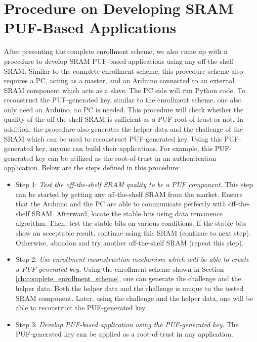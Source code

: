 
\section{Procedure on Developing SRAM PUF-Based Applications}\label{ch:procedure_develop}
After presenting the complete enrollment scheme, we also come up with a procedure to develop SRAM PUF-based applications using any off-the-shelf SRAM.
Similar to the complete enrollment scheme, this procedure scheme also requires a PC, acting as a master, and an Arduino connected to an external SRAM component which acts as a slave. The PC side will run Python code. To reconstruct the PUF-generated key, similar to the enrollment scheme, one also only need an Arduino, no PC is needed.
This procedure will check whether the quality of the off-the-shelf SRAM is sufficient as a PUF root-of-trust or not. In addition, the procedure also generates the helper data and the challenge of the SRAM which can be used to reconstruct PUF-generated key. Using this PUF-generated key, anyone can build their applications. For example, this PUF-generated key can be utilized as the root-of-trust in an authentication application. Below are the steps defined in this procedure:
\begin{itemize}
  \item Step 1: \textit{Test the off-the-shelf SRAM quality to be a PUF component.}\newline
  This step can be started by getting any off-the-shelf SRAM from the market. Ensure that the Arduino and the PC are able to communicate perfectly with off-the-shelf SRAM. Afterward, locate the stable bits using data remanence algorithm. Then, test the stable bits on various conditions. If the stable bits show an acceptable result, continue using this SRAM (continue to next step). Otherwise, abandon and try another off-the-shelf SRAM (repeat this step).
  \item Step 2: \textit{Use enrollment-reconstruction mechanism which will be able to create a PUF-generated key.}\newline
  Using the enrollment scheme shown in Section \ref{ch:complete_enrollment_scheme}, one can generate the challenge and the helper data. Both the helper data and the challenge is unique to the tested SRAM component. Later, using the challenge and the helper data, one will be able to reconstruct the PUF-generated key.
  \item Step 3: \textit{Develop PUF-based application using the PUF-generated key.}\newline
  The PUF-generated key can be applied as a root-of-trust in any application.
\end{itemize}

